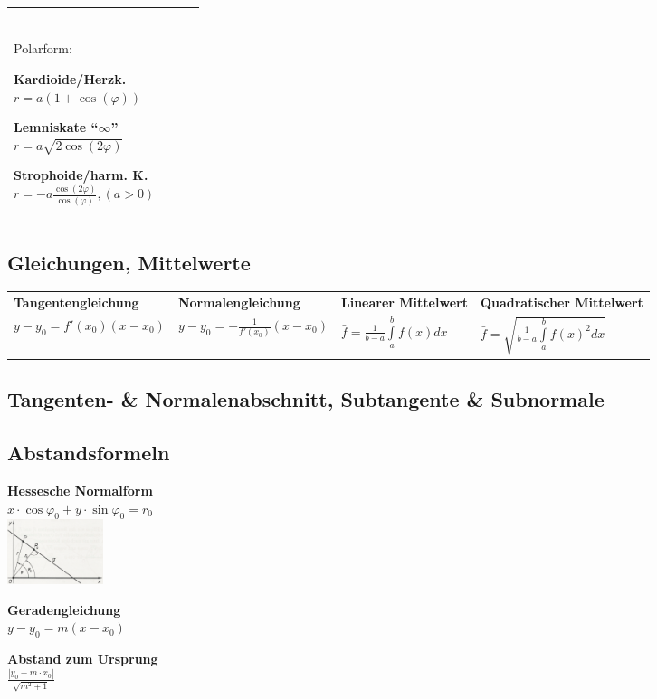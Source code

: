 \begin{tabular}{llll}
\parbox{2.7cm}{
\textbf{} \\
Polarform:
}

\parbox{5cm}{
\textbf{Kardioide/Herzk. } \\
$r = a(1+\cos(\varphi))$
}

\parbox{5cm}{
\textbf{Lemniskate ``$\infty$'' } \\
$r = a\sqrt{2\cos(2\varphi)}$ 
}

\parbox{5cm}{
\textbf{Strophoide/harm. K. } \\
$ r = -a \frac{\cos(2\varphi)}{\cos(\varphi)},(a>0) $ 
}

\end{tabular}

\subsection{Gleichungen, Mittelwerte}
\begin{tabular}{llll}
  \textbf{Tangentengleichung} &
  \textbf{Normalengleichung} &
  \textbf{Linearer Mittelwert} &
  \textbf{Quadratischer Mittelwert}\\
  $y-y_0=f'(x_0)(x-x_0)$ &
  $y-y_0=-\frac{1}{f'(x_0)}(x-x_0)$ &
  $\bar{f} = \frac{1}{b-a} \int\limits_{a}^{b} f(x)dx$ &
  $\bar{f} = \sqrt{\frac{1}{b-a} \int\limits_{a}^{b} f(x)^2dx}$
\end{tabular}
  
\subsection{Tangenten- \& Normalenabschnitt, Subtangente \&
Subnormale}

\subsection{Abstandsformeln}
\begin{minipage}{6.5cm}
    \textbf{Hessesche Normalform}\\
    $x\cdot \cos\varphi_0 +y\cdot \sin\varphi_0=r_0$\\
    \includegraphics[width=2.8cm]{./bilder/hessenorm.png}
\end{minipage}
\begin{minipage}{6.5cm}
  \textbf{Geradengleichung} \\
  $y - y_0 = m (x - x_0)$
\end{minipage}
\begin{minipage}{6cm}
  \textbf{Abstand zum Ursprung} \\
  $\frac{|y_0 - m \cdot x_0|}{\sqrt{m^2 + 1}}$
\end{minipage}

